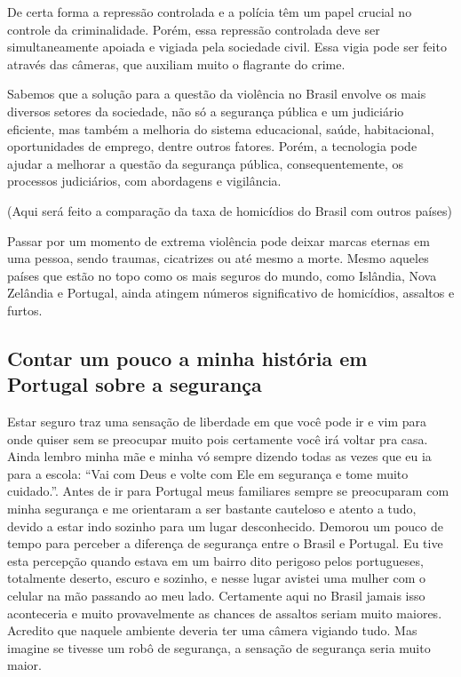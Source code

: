 \documentclass[12pt,a4paper]{article}
\begin{document}
    De certa forma a repressão controlada e a polícia têm um papel crucial no controle da criminalidade. Porém, essa repressão controlada deve ser simultaneamente apoiada e vigiada pela sociedade civil. Essa vigia pode ser feito através das câmeras, que auxiliam muito o flagrante do crime.

    Sabemos que a solução para a questão da violência no Brasil envolve os mais diversos setores da sociedade, não só a segurança pública e um judiciário eficiente, mas também a melhoria do sistema educacional, saúde, habitacional, oportunidades de emprego, dentre outros fatores. Porém, a tecnologia pode ajudar a melhorar a questão da segurança pública, consequentemente, os processos judiciários, com abordagens e vigilância. 

    (Aqui será feito a comparação da taxa de homicídios
    do Brasil com outros países)

    Passar por um momento de extrema violência pode deixar marcas eternas em uma pessoa, sendo traumas, cicatrizes ou até mesmo a morte. Mesmo aqueles países que estão no topo como os mais seguros do mundo, como Islândia, Nova Zelândia e Portugal, ainda atingem números significativo de homicídios, assaltos e furtos.

    \subsection{Contar um pouco a minha história em Portugal sobre a segurança}

    Estar seguro traz uma sensação de liberdade em que você pode ir e vim para onde quiser sem se preocupar muito pois certamente você irá voltar pra casa. Ainda lembro minha mãe e minha vó sempre dizendo todas as vezes que eu ia para a escola: “Vai com Deus e volte com Ele em segurança e tome muito cuidado.”. Antes de ir para Portugal meus familiares sempre se preocuparam com minha segurança e me orientaram a ser bastante cauteloso e atento a tudo, devido a estar indo sozinho para um lugar desconhecido. Demorou um pouco de tempo para perceber a diferença de segurança entre o Brasil e Portugal. Eu tive esta percepção quando estava em um bairro dito perigoso pelos portugueses, totalmente deserto, escuro e sozinho, e nesse lugar avistei uma mulher com o celular na mão passando ao meu lado. Certamente aqui no Brasil jamais isso aconteceria e muito provavelmente as chances de assaltos seriam muito maiores. Acredito que naquele ambiente deveria ter uma câmera vigiando tudo. Mas imagine se tivesse um robô de segurança, a sensação de segurança seria muito maior.
\end{document}
